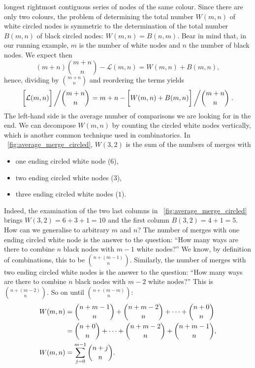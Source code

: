 longest rightmost contiguous series of nodes of the same colour. Since
there are only two colours, the problem of determining the total
number \(W(m,n)\) of white circled nodes is symmetric to the
determination of the total number \(B(m,n)\) of black circled nodes:
\(W(m,n) = B(n,m)\). Bear in mind that, in our running example, \(m\)
is the number of white nodes and \(n\) the number of black nodes. We
expect then
\[
(m + n) \binom{m+n}{n} - \mathcal{L}(m,n) = W(m,n) + B(m,n),
\]
hence,\label{average_delay_merge} dividing by \(\binom{m+n}{n}\) and
reordering the terms yields
\[
\biggl[\mathcal{L}(m,n)\biggr]\left/\binom{m+n}{n}\right.
= m + n - \biggl[W(m,n) + B(m,n)\biggr]\left/\binom{m+n}{n}\right..
\]
The left\hyp{}hand side is the average number of comparisons we are
looking for in the end. We can decompose \(W(m,n)\) by counting the
circled white nodes vertically, which is another common technique used
in combinatorics. In \fig~\vref{fig:average_merge_circled}, \(W(3,2)\)
is the sum of the numbers of merges with
\begin{itemize}

  \item one ending circled white node (\(6\)),

  \item two ending circled white nodes (\(3\)),

  \item three ending circled white nodes (\(1\)).
\end{itemize}
Indeed, the examination of the two last columns in
\fig~\vref{fig:average_merge_circled} brings \(W(3,2) = 6 + 3 + 1 =
10\) and the first column \(B(3,2) = 4 + 1 = 5\). How can we
generalise to arbitrary \(m\) and \(n\)? The number of merges with one
ending circled white node is the answer to the question: ``How many
ways are there to combine \(n\) black nodes with \(m-1\) white
nodes?'' We know, by definition of combinations, this to be
\(\binom{n+(m-1)}{n}\). Similarly, the number of merges with two
ending circled white nodes is the answer to the question: ``How many
ways are there to combine \(n\) black nodes with \(m-2\) white nodes?''
This is \(\binom{n+(m-2)}{n}\). So on until
\(\binom{n+(m-m)}{n}\):
\begin{align}
W(m,n) %
  &= \binom{n+m-1}{n} + \binom{n+m-2}{n} + \dots + \binom{n+0}{n}\notag\\
  &= \binom{n+0}{n} + \dots + \binom{n+m-2}{n} + \binom{n+m-1}{n}\notag,\\
W(m,n)
  &= \sum_{j=0}^{m-1}{\binom{n+j}{n}}.\label{eq:W}
\end{align}
